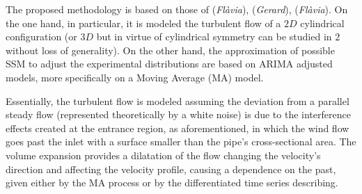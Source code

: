\documentclass{article}
\theoremstyle{definition}
\theoremstyle{definition}
\theoremstyle{remark}
\theoremstyle{mythmstyle}
\begin{document}
The proposed methodology is based on those of \cite{deng2018recovering} (\textit{Flàvia}), \cite{kato2011hybrid} (\textit{Gerard}), \cite{mons2016reconstruction} (\textit{Flàvia}). On the one hand, in particular, it is modeled the turbulent flow of a $2D$ cylindrical configuration (or $3D$ but in virtue of cylindrical symmetry can be studied in $2$ without loss of generality).
On the other hand, the approximation of possible SSM to adjust the experimental distributions are based on ARIMA adjusted models, more specifically on a Moving Average (MA) model.

Essentially, the turbulent flow is modeled assuming the deviation from a parallel steady flow (represented theoretically by a white noise) is due to the interference effects created at the entrance region, as aforementioned, in which the wind flow goes past the inlet with a surface smaller than the pipe's cross-sectional area. The volume expansion provides a dilatation of the flow changing the velocity's direction and affecting the velocity profile, causing a dependence on the past, given either by the MA process or by the differentiated time series describing. 
\end{document}
